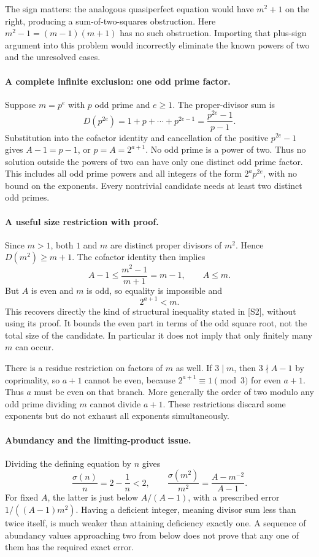 \documentclass[11pt,a4paper]{article}
\begin{document}
The sign matters: the analogous quasiperfect equation would have
$m^2+1$ on the right, producing a sum-of-two-squares obstruction.
Here $m^2-1=(m-1)(m+1)$ has no such obstruction. Importing that
plus-sign argument into this problem would incorrectly eliminate the
known powers of two and the unresolved cases.

\paragraph{A complete infinite exclusion: one odd prime factor.}
Suppose $m=p^e$ with $p$ odd prime and $e\ge1$. The proper-divisor
sum is
\[
 D(p^{2e})=1+p+\cdots+p^{2e-1}
                  =\frac{p^{2e}-1}{p-1}.
\]
Substitution into the cofactor identity and cancellation of the positive
$p^{2e}-1$ gives $A-1=p-1$, or $p=A=2^{a+1}$. No odd prime is a
power of two. Thus no solution outside the powers of two can have only
one distinct odd prime factor. This includes all odd prime powers and
all integers of the form $2^a p^{2e}$, with no bound on the exponents.
Every nontrivial candidate needs at least two distinct odd primes.

\paragraph{A useful size restriction with proof.}
Since $m>1$, both $1$ and $m$ are distinct proper divisors of $m^2$.
Hence $D(m^2)\ge m+1$. The cofactor identity then implies
\[
               A-1\le\frac{m^2-1}{m+1}=m-1,
 \qquad A\le m.
\]
But $A$ is even and $m$ is odd, so equality is impossible and
\[
                         2^{a+1}<m.
\]
This recovers directly the kind of structural inequality stated in
[S2], without using its proof. It bounds the even part in terms of the
odd square root, not the total size of the candidate. In particular it
does not imply that only finitely many $m$ can occur.

There is a residue restriction on factors of $m$ as well. If $3\mid m$,
then $3\nmid A-1$ by coprimality, so $a+1$ cannot be even, because
$2^{a+1}\equiv1\pmod3$ for even $a+1$. Thus $a$ must be even on
that branch. More generally the order of two modulo any odd prime
dividing $m$ cannot divide $a+1$. These restrictions discard some
exponents but do not exhaust all exponents simultaneously.

\paragraph{Abundancy and the limiting-product issue.}
Dividing the defining equation by $n$ gives
\[
 \frac{\sigma(n)}n=2-\frac1n<2,
 \qquad
 \frac{\sigma(m^2)}{m^2}
       =\frac{A-m^{-2}}{A-1}.
\]
For fixed $A$, the latter is just below $A/(A-1)$, with a prescribed
error $1/((A-1)m^2)$. Having a deficient integer, meaning divisor sum
less than twice itself, is much weaker than attaining deficiency
exactly one. A sequence of abundancy values approaching two from below
does not prove that any one of them has the required exact error.
\end{document}
